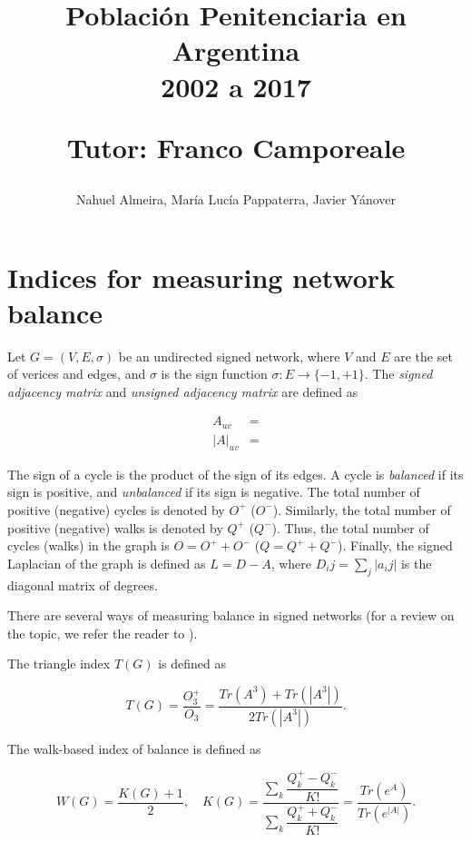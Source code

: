\documentclass[10pt]{article}
\begin{document}
	
\title{Población Penitenciaria en Argentina\\ 2002 a 2017 \\
	\begin{small}
		Tutor: Franco Camporeale
	\end{small}}
\author{\small{Nahuel Almeira, María Lucía Pappaterra, Javier Y\'anover}}


\section{Indices for measuring network balance}

Let $G = (V, E, \sigma)$ be an undirected signed network, where $V$ and $E$ are the set of verices and edges, and $\sigma$ is the sign function $\sigma: E \rightarrow \lbrace -1, +1\rbrace$. The \emph{signed adjacency matrix} and \emph{unsigned adjacency matrix} are defined as 

\begin{align}
A_{uv} &= \\
|A|_{uv} &= 
\end{align}

The sign of a cycle is the product of the sign of its edges. A cycle is \emph{balanced} if its sign is positive, and \emph{unbalanced} if its sign is negative. The total number of positive (negative) cycles is denoted by $O^{+}$ ($O^{-}$). Similarly, the total number of positive (negative) walks is denoted by  $Q^{+}$ ($Q^{-}$). Thus, the total number of cycles (walks) in the graph is $O = O^{+} + O^{-}$ ($Q = Q^{+} + Q^{-}$). Finally, the signed Laplacian of the graph is defined as $L = D-A$, where $D_ij = \sum_j |a_ij|$ is the diagonal matrix of degrees. 

There are several ways of measuring balance in signed networks (for a review on the topic, we refer the reader to \cite{Aref2018}).

The triangle index $T(G)$  is defined as 

\begin{equation}
T(G) = \dfrac{O^+_3}{O_3} = \dfrac{Tr(A^3) + Tr(|A^3|)}{2Tr(|A^3|)}.
\end{equation}

The walk-based index of balance is defined as 

\begin{equation}
W(G) = \dfrac{K(G) + 1}{2}, \quad K(G) = \dfrac{\sum_k\dfrac{Q^{+}_k - Q^{-}_k}{K!}}{\sum_k\dfrac{Q^{+}_k + Q^{-}_k}{K!}} = \dfrac{Tr(e^{A})}{Tr(e^{|A|})}.
\end{equation}
\end{document}
